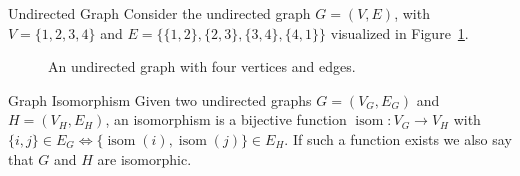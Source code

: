 \begin{exmp}[label=exmp:undirected_graph]{Undirected Graph}
  Consider the undirected graph $G = (V, E)$, with $V = \{1,2,3,4\}$ and $E =
  \{\{1,2\},\{2,3\},\{3,4\},\{4,1\}\}$ visualized in
  Figure~\ref{fig:undirected_graph}.
  \begin{figure}[H]
    \centering
    \caption{An undirected graph with four vertices and edges.}
    \label{fig:undirected_graph}
  \end{figure}
\end{exmp}

\begin{defn}{Graph Isomorphism}
  Given two undirected graphs $G = (V_G, E_G)$ and $H = (V_H, E_H)$, an
  isomorphism is a bijective function $\operatorname{isom}: V_G \rightarrow V_H$
  with $\{i,j\} \in E_G \Leftrightarrow
  \{\operatorname{isom}(i),\operatorname{isom}(j)\} \in E_H$. If such a function
  exists we also say that $G$ and $H$ are isomorphic.
\end{defn}

